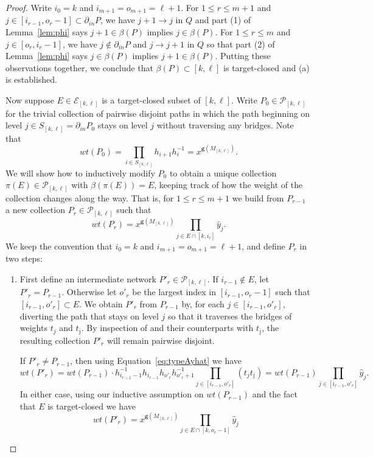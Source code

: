 \documentclass[12pt]{amsart}
\newcommand{\bfg}{\mathbf{g}}
\newcommand{\grep}{\bfg}
\newcommand{\cE}{\mathcal{E}}
\newcommand{\cP}{\mathcal{P}}
\newcommand{\ol}[1]{\overline{#1}}
\newcommand{\Qrep}{M}
\theoremstyle{remark}
\numberwithin{equation}{section}
\numberwithin{figure}{section}
\begin{document}
\begin{proof}
  Write $i_0=k$ and $i_{m+1}=o_{m+1}=\ell+1$.
  For $1\le r\le m+1$ and $j\in[i_{r-1},o_r-1]\subset\partial_{in}P$, we have $j+1\to j$ in $Q$ and part (1) of Lemma~\ref{lem:phi} says $j+1\in\beta(P)$ implies $j\in\beta(P)$.
  For $1\le r\le m$ and $j\in[o_r,i_r-1]$, we have $j\notin\partial_{in}P$ and $j\to j+1$ in $Q$ so that part (2) of Lemma~\ref{lem:phi} says $j\in\beta(P)$ implies $j+1\in\beta(P)$.
  Putting these observations together, we conclude that $\beta(P)\subset[k,\ell]$ is target-closed and (a) is established.
  
  Now suppose $E\in\cE_{[k,\ell]}$ is a target-closed subset of $[k,\ell]$.
  Write $P_0\in\cP_{[k,\ell]}$ for the trivial collection of pairwise disjoint paths in which the path beginning on level $j\in S_{[k,\ell]}=\partial_{in}P_0$ stays on level $j$ without traversing any bridges.
  Note that 
  \[
    wt(P_0)=\prod_{i \in S_{[k,\ell]}}h_{i+1} h_i^{-1}=x^{\grep(\Qrep_{[k,\ell]})}.
  \]  
  We will show how to inductively modify $P_0$ to obtain a unique collection $\pi(E)\in\cP_{[k,\ell]}$ with $\beta(\pi(E))=E$, keeping track of how the weight of the collection changes along the way.
  That is, for $1\le r\le m+1$ we build from $P_{r-1}$ a new collection $P_r \in \cP_{[k,\ell]}$ such that
  \[
    wt(P_r) = x^{\grep(\Qrep_{[k,\ell]})} \prod_{j \in E \cap [k,i_r]} \hat{y}_j.
  \]
  We keep the convention that $i_0=k$ and $i_{m+1}=o_{m+1}=\ell+1$, and define $P_r$ in two steps:
  \begin{enumerate}
    \item 
      First define an intermediate network $P'_r \in \cP_{[k,\ell]}$.
      If $i_{r-1} \notin E$, let $P'_r=P_{r-1}$.
      Otherwise let $o'_r$ be the largest index in $[i_{r-1},o_r-1]$ such that $[i_{r-1},o'_r]\subset E$.
      We obtain $P'_r$ from $P_{r-1}$ by, for each $j\in[i_{r-1},o'_r]$, diverting the path that stays on level $j$ so that it traverses the bridges of weights $t_j$ and $t_{\ol{\jmath}}$.
      By inspection of   and their counterparts with $t_{\ol{\jmath}}$, the resulting collection $P'_r$ will remain pairwise disjoint.
  
      If $P'_r \neq P_{r-1}$, then using Equation~\ref{eq:typeAyhat} we have
      \[
        wt(P'_r)=wt(P_{r-1})\cdot h_{i_{r-1}-1}^{-1}h_{i_{r-1}}h_{o'_r}h_{o'_r+1}^{-1}\prod_{j\in[i_{r-1},o'_r]}(t_jt_{\ol{\jmath}}) = wt(P_{r-1})\prod_{j \in [i_{r-1},o'_r]} \hat{y}_j.
      \]
      In either case, using our inductive assumption on $wt(P_{r-1})$ and the fact that $E$ is target-closed we have 
      \[
        wt(P'_r) = x^{\grep(\Qrep_{[k,\ell]})} \prod_{j \in E \cap [k,o_{r}-1]} \hat{y}_j
      \]


\end{enumerate}
\end{proof}
\end{document}
